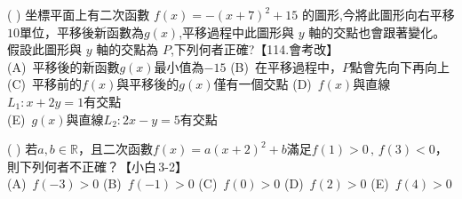 \documentclass[b4paper,12pt]{exam}
\newcommand{\anslabel}[1]{%
  \makebox[3em][c]{%
    \ifshowAnswer{\color{red}#1}\else\phantom{#1}\fi
  }%
}
\newif\ifshowAnswer
\begin{document}
\begin{enumerate}[itemsep=0.5em, topsep=1em,
                  label=\arabic*.]
    \item(\anslabel{CDE}) 坐標平面上有二次函數 $f(x) = −( x + 7 )^2 + 15$ 的圖形,今將此圖形向右平移 $10$單位，平移後新函數為$g(x)$,平移過程中此圖形與 $y$ 軸的交點也會跟著變化。假設此圖形與 $y$ 軸的交點為 $P$,下列何者正確?【114.會考改】\\[.5em]
        (A)~{平移後的新函數$g(x)$最小值為$-15$}\hspace{9.5em}
        (B)~{在平移過程中，$P$點會先向下再向上}\\[.5em]
        (C)~{平移前的$f(x)$與平移後的$g(x)$僅有一個交點}\hspace{5em}
        (D)~{$f(x)$與直線$L_1:x+2y=1$有交點}\\[.5em]
        (E)~{$g(x)$與直線$L_2:2x-y=5$有交點}

    \begin{minipage}[t]{0.65\linewidth}
        \item(\anslabel{ACE}) 若$a,b\in\mathbb{R}$，且二次函數$f(x)=a(x+2)^2+b$滿足$f(1)>0\,,\,f(3)<0$，則下列何者不正確？【小白\,3-2】\\[.5em]
            (A)~{$f(-3)>0$}\hspace{2em}
            (B)~{$f(-1)>0$}\hspace{2em}
            (C)~{$f(0)>0$}\hspace{2em}
            (D)~{$f(2)>0$}\hspace{2em}
            (E)~{$f(4)>0$}\\


\end{minipage}
\end{enumerate}
\end{document}
